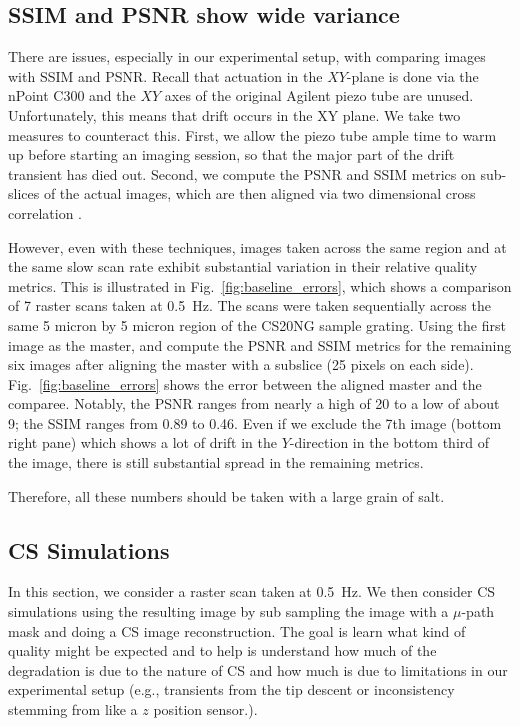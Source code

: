 \documentclass[11pt]{article}
\begin{document}
\subsection{SSIM and PSNR show wide variance}
There are issues, especially in our experimental setup, with comparing images with SSIM and PSNR. Recall that actuation in the $XY$-plane is done via the nPoint C300 and the $XY$ axes of the original Agilent piezo tube are unused. Unfortunately, this means that drift occurs in the XY plane. We take two measures to counteract this. First, we allow the piezo tube ample time to warm up before starting an imaging session, so that the major part of the drift transient has died out. Second, we compute the PSNR and SSIM metrics on sub-slices of the actual images, which are then aligned via two dimensional cross correlation \cite{mw_xcorr2}. 

However, even with these techniques, images taken across the same region and at the same slow scan rate exhibit substantial variation in their relative quality metrics. This is illustrated in Fig.~\ref{fig:baseline_errors}, which shows a comparison of 7 raster scans taken at 0.5~Hz. The scans were taken sequentially across the same 5 micron by 5 micron region of the CS20NG sample grating. Using the first image as the master, and compute the PSNR and SSIM metrics for the remaining six images after aligning the master with a subslice (25 pixels on each side). Fig.~\ref{fig:baseline_errors} shows the error between the aligned master and the comparee. Notably, the PSNR ranges from nearly a high of 20 to a low of about 9; the SSIM ranges from 0.89 to 0.46. Even if we exclude the 7th image (bottom right pane) which shows a lot of drift in the $Y$-direction in the bottom third of the image, there is still substantial spread in the remaining metrics. 

Therefore, all these numbers should be taken with a large grain of salt.



\subsection{CS Simulations}
In this section, we consider a raster scan taken at 0.5~Hz. We then consider CS simulations using the resulting image by sub sampling the image with a $\mu$-path mask and doing a CS image reconstruction. The goal is learn what kind of quality might be expected and to help is understand how much of the degradation is due to the nature of CS and how much is due to limitations in our experimental setup (e.g., transients from the tip descent or inconsistency stemming from like a $z$ position sensor.).
\end{document}
